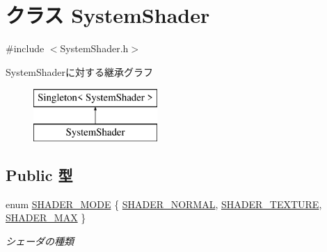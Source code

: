 \hypertarget{class_system_shader}{\section{クラス System\-Shader}
\label{class_system_shader}
}


{\ttfamily \#include $<$System\-Shader.\-h$>$}

System\-Shaderに対する継承グラフ\begin{figure}[H]
\begin{center}
\leavevmode
\includegraphics[height=2.000000cm]{d5/d84/class_system_shader}
\end{center}
\end{figure}
\subsection*{Public 型}
\begin{DoxyCompactItemize}
\item 
enum \hyperlink{class_system_shader_a045af48fcf9fd181b1504389a204cadc}{S\-H\-A\-D\-E\-R\-\_\-\-M\-O\-D\-E} \{ \hyperlink{class_system_shader_a045af48fcf9fd181b1504389a204cadcad4c9a15c9fe56663a6d8ab42b1bea9bd}{S\-H\-A\-D\-E\-R\-\_\-\-N\-O\-R\-M\-A\-L}, 
\hyperlink{class_system_shader_a045af48fcf9fd181b1504389a204cadcacb7eeae7f61ee30d58c4c185a14c767d}{S\-H\-A\-D\-E\-R\-\_\-\-T\-E\-X\-T\-U\-R\-E}, 
\hyperlink{class_system_shader_a045af48fcf9fd181b1504389a204cadcaa3a02ca217f89e34796dfb3146ca79c4}{S\-H\-A\-D\-E\-R\-\_\-\-M\-A\-X}
 \}
\begin{DoxyCompactList}\small\item\em シェーダの種類 \end{DoxyCompactList}\end{DoxyCompactItemize}
